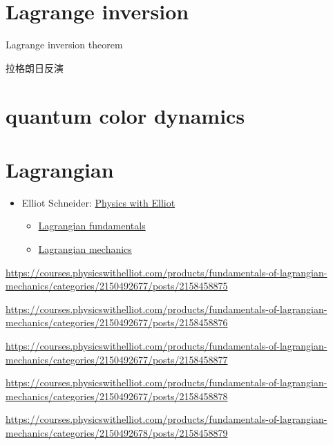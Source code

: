 \documentclass[
]{book}
\providecommand{\tightlist}{%
  \setlength{\itemsep}{0pt}\setlength{\parskip}{0pt}}
\theoremstyle{definition}
\theoremstyle{definition}
\theoremstyle{definition}
\theoremstyle{definition}
\theoremstyle{remark}
\begin{document}
\chapter{Lagrange inversion}\label{lagrange-inversion}

Lagrange inversion theorem

\begin{CJK}{UTF8}{bsmi}
拉格朗日反演
\end{CJK}

\chapter{quantum color dynamics}\label{quantum-color-dynamics}

\chapter{Lagrangian}\label{lagrangian}

\begin{itemize}
\tightlist
\item
  Elliot Schneider: \href{https://www.youtube.com/@PhysicswithElliot/playlists}{Physics with Elliot}

  \begin{itemize}
  \tightlist
  \item
    \href{https://courses.physicswithelliot.com/products/fundamentals-of-lagrangian-mechanics}{Lagrangian fundamentals}
  \item
    \href{https://www.youtube.com/playlist?list=PL-IZN8QRUw-xRsoJPtXBlJyWlWrjVEF0x}{Lagrangian mechanics}
  \end{itemize}
\end{itemize}

\url{https://courses.physicswithelliot.com/products/fundamentals-of-lagrangian-mechanics/categories/2150492677/posts/2158458875}

\url{https://courses.physicswithelliot.com/products/fundamentals-of-lagrangian-mechanics/categories/2150492677/posts/2158458876}

\url{https://courses.physicswithelliot.com/products/fundamentals-of-lagrangian-mechanics/categories/2150492677/posts/2158458877}

\url{https://courses.physicswithelliot.com/products/fundamentals-of-lagrangian-mechanics/categories/2150492677/posts/2158458878}

\url{https://courses.physicswithelliot.com/products/fundamentals-of-lagrangian-mechanics/categories/2150492678/posts/2158458879}
\end{document}
